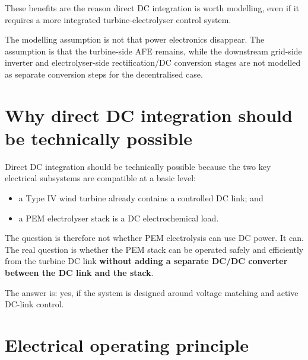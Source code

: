 \documentclass[
  letterpaper,
  DIV=11,
  numbers=noendperiod]{scrartcl}
\providecommand{\tightlist}{%
  \setlength{\itemsep}{0pt}\setlength{\parskip}{0pt}}
\begin{document}
These benefits are the reason direct DC integration is worth modelling,
even if it requires a more integrated turbine-electrolyser control
system.

\begin{tcolorbox}[enhanced jigsaw, arc=.35mm, bottomrule=.15mm, bottomtitle=1mm, breakable, colback=white, colbacktitle=quarto-callout-tip-color!10!white, colframe=quarto-callout-tip-color-frame, coltitle=black, left=2mm, leftrule=.75mm, opacityback=0, opacitybacktitle=0.6, rightrule=.15mm, title=\textcolor{quarto-callout-tip-color}{\faLightbulb}\hspace{0.5em}{Modelling implication}, titlerule=0mm, toprule=.15mm, toptitle=1mm]

The modelling assumption is not that power electronics disappear. The
assumption is that the turbine-side AFE remains, while the downstream
grid-side inverter and electrolyser-side rectification/DC conversion
stages are not modelled as separate conversion steps for the
decentralised case.

\end{tcolorbox}

\section{Why direct DC integration should be technically
possible}\label{why-direct-dc-integration-should-be-technically-possible}

Direct DC integration should be technically possible because the two key
electrical subsystems are compatible at a basic level:

\begin{itemize}
\tightlist
\item
  a Type IV wind turbine already contains a controlled DC link; and
\item
  a PEM electrolyser stack is a DC electrochemical load.
\end{itemize}

The question is therefore not whether PEM electrolysis can use DC power.
It can. The real question is whether the PEM stack can be operated
safely and efficiently from the turbine DC link \textbf{without adding a
separate DC/DC converter between the DC link and the stack}.

The answer is: yes, if the system is designed around voltage matching
and active DC-link control.

\section{Electrical operating
principle}\label{electrical-operating-principle}
\end{document}
